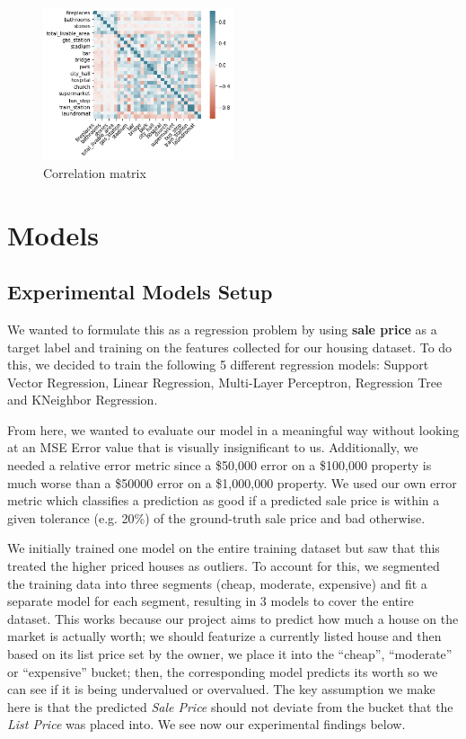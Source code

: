 \documentclass[11pt,a4paper]{article}
\begin{document}
\begin{figure}[h]
\centering
\includegraphics[width=0.5\textwidth]{result-data/correlation_matrix}
\caption{Correlation matrix}
\label{fig:corr}
\end{figure}


\section{Models}

\subsection{Experimental Models Setup}

We wanted to formulate this as a regression problem by using \textbf{sale price} as a target label and training on the features collected for our housing dataset. To do this, we decided to train the following 5 different regression models: Support Vector Regression, Linear Regression, Multi-Layer Perceptron, Regression Tree and KNeighbor Regression.

\medskip

From here, we wanted to evaluate our model in a meaningful way without looking at an MSE Error value that is visually insignificant to us. Additionally, we needed a relative error metric since a \$50,000 error on a \$100,000 property is much worse than a \$50000 error on a \$1,000,000 property. We used our own error metric which classifies a prediction as good if a predicted sale price is within a given tolerance (e.g. 20\%) of the ground-truth sale price and bad otherwise. 

\medskip

We initially trained one model on the entire training dataset but saw that this treated the higher priced houses as outliers. To account for this, we segmented the training data into three segments (cheap, moderate, expensive) and fit a separate model for each segment, resulting in 3 models to cover the entire dataset. This works because our project aims to predict how much a house on the market is actually worth; we should featurize a currently listed house and then based on its list price set by the owner, we place it into the ``cheap'', ``moderate'' or ``expensive'' bucket; then, the corresponding model predicts its worth so we can see if it is being undervalued or overvalued. The key assumption we make here is that the predicted \textit{Sale Price} should not deviate from the bucket that the \textit{List Price} was placed into. 
We see now our experimental findings below.
\end{document}
